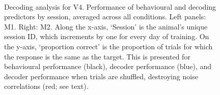 \begin{figure}[htbp]
    ~~
    \caption{%
    Decoding analysis for \ac{V4}.
    Performance of behavioural and decoding predictors by session, averaged across all conditions.
    Left panels: \ac{M1}. Right: \ac{M2}.
	Along the x-axis, `Session' is the animal's unique session ID, which increments by one for every day of training.
    On the y-axis, `proportion correct' is the proportion of trials for which the response is the same as the target.
    This is presented for behavioural performance (black), decoder performance (blue), and decoder performance when trials are shuffled, destroying noise correlations (red; see text).
}
    \label{fig:dec_all_v4}
\end{figure}

